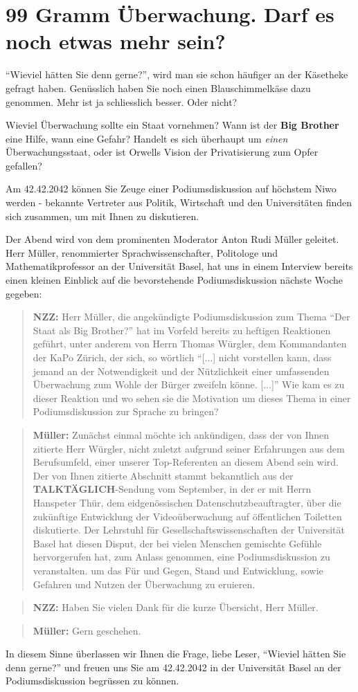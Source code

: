 \section*{99 Gramm Überwachung. Darf es noch etwas mehr sein?}
"`Wieviel hätten Sie denn gerne?"', wird man sie schon
häufiger an der Käsetheke gefragt haben. Genüsslich haben
Sie noch einen Blauschimmelkäse dazu genommen. Mehr ist ja
schliesslich besser. Oder nicht?

Wieviel Überwachung sollte ein Staat vornehmen? Wann ist
der \textbf{Big Brother} eine Hilfe, wann eine Gefahr?
Handelt es sich überhaupt um \textit{einen} Überwachungsstaat,
oder ist Orwells Vision der Privatisierung zum Opfer gefallen?

Am 42.42.2042 können Sie Zeuge einer Podiumsdiskussion auf
höchstem Niwo werden - bekannte Vertreter aus Politik, Wirtschaft
und den Universitäten finden sich zusammen, um mit Ihnen
zu diskutieren.

Der Abend wird von dem prominenten Moderator Anton Rudi Müller
geleitet. Herr Müller, renommierter Sprachwissenschafter, Politologe
und Mathematikprofessor an der Universität Basel, hat uns in
einem Interview bereits einen kleinen Einblick auf die 
bevorstehende Podiumsdiskussion nächste Woche gegeben:

\begin{quote}
\textbf{NZZ:} Herr Müller, die angekündigte Podiumsdiskussion zum Thema
"`Der Staat als Big Brother?"' hat im Vorfeld bereits zu
heftigen Reaktionen geführt, unter anderem von Herrn
Thomas Würgler, dem Kommandanten der KaPo Zürich, der
sich, so wörtlich "`[...] nicht vorstellen kann, dass jemand
an der Notwendigkeit und der Nützlichkeit einer umfassenden
Überwachung zum Wohle der Bürger zweifeln könne. [...]"'
Wie kam es zu dieser Reaktion und wo sehen sie die Motivation
um dieses Thema in einer Podiumsdiskussion zur Sprache zu
bringen?
\end{quote}
\begin{quote}
\textbf{Müller:} Zunächst einmal möchte ich ankündigen, dass
der von Ihnen zitierte Herr Würgler, nicht zuletzt aufgrund
seiner Erfahrungen aus dem Berufsumfeld, einer unserer Top-Referenten
an diesem Abend sein wird. Der von Ihnen zitierte Abschnitt stammt
bekanntlich aus der \textbf{TALKTÄGLICH}-Sendung vom September,
in der er mit Herrn Hanspeter Thür,
dem eidgenössischen Datenschutzbeauftragter, über die zukünftige
Entwicklung der Videoüberwachung auf öffentlichen Toiletten
diskutierte. 
Der Lehrstuhl für Gesellschaftswissenschaften der Universität Basel
hat diesen Disput, der bei vielen Menschen gemischte Gefühle
hervorgerufen hat, zum Anlass genommen, eine Podiumsdiskussion
zu veranstalten. um das Für und Gegen, Stand und Entwicklung,
sowie Gefahren und Nutzen der Überwachung zu eruieren.
\end{quote}
\begin{quote}
\textbf{NZZ:} Haben Sie vielen Dank für die kurze Übersicht,
Herr Müller.
\end{quote}
\begin{quote}
\textbf{Müller:} Gern geschehen.
\end{quote}

In diesem Sinne überlassen wir Ihnen die Frage, liebe Leser,
"`Wieviel hätten Sie denn gerne?"' und freuen uns Sie am
42.42.2042 in der Universität Basel an der Podiumsdiskussion
begrüssen zu können.
